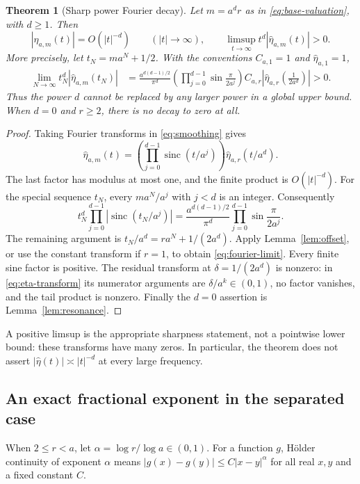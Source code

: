 \documentclass[11pt,a4paper]{article}
\newtheorem{theorem}{Theorem}[section]
\theoremstyle{definition}
\theoremstyle{remark}
\newcommand{\sinc}{\operatorname{sinc}}
\begin{document}
\begin{theorem}[Sharp power Fourier decay]\label{thm:fourier}
Let $m=a^dr$ as in \eqref{eq:base-valuation}, with $d\ge1$. Then
\begin{equation}\label{eq:fourier-order}
 |\widehat\eta_{a,m}(t)|=O(|t|^{-d})\qquad(|t|\to\infty),
 \qquad
 \limsup_{t\to\infty}t^d|\widehat\eta_{a,m}(t)|>0.
\end{equation}
More precisely, let $t_N=ma^N+1/2$. With the conventions
$C_{a,1}=1$ and $\widehat\eta_{a,1}=1$,
\begin{align}\label{eq:fourier-limit}
 \lim_{N\to\infty}t_N^d|\widehat\eta_{a,m}(t_N)|
 &=\frac{a^{d(d-1)/2}}{\pi^d}
   \left(\prod_{j=0}^{d-1}\sin\frac{\pi}{2a^j}\right)
   C_{a,r}\left|\widehat\eta_{a,r}\left(\frac1{2a^d}\right)\right|
 >0.
\end{align}
Thus the power $d$ cannot be replaced by any larger power in a global
upper bound. When $d=0$ and $r\ge2$, there is no decay to zero at all.
\end{theorem}
\begin{proof}
Taking Fourier transforms in \eqref{eq:smoothing} gives
\[
 \widehat\eta_{a,m}(t)
 =\left(\prod_{j=0}^{d-1}\sinc(t/a^j)\right)
   \widehat\eta_{a,r}(t/a^d).
\]
The last factor has modulus at most one, and the finite product is
$O(|t|^{-d})$.
For the special sequence $t_N$, every $ma^N/a^j$ with $j<d$ is an integer.
Consequently
\[
 t_N^d\prod_{j=0}^{d-1}|\sinc(t_N/a^j)|
 =\frac{a^{d(d-1)/2}}{\pi^d}
   \prod_{j=0}^{d-1}\sin\frac{\pi}{2a^j}.
\]
The remaining argument is
$t_N/a^d=ra^N+1/(2a^d)$. Apply Lemma~\ref{lem:offset}, or use the constant
transform if $r=1$, to obtain \eqref{eq:fourier-limit}.
Every finite sine factor is positive. The residual transform at
$\delta=1/(2a^d)$ is nonzero: in \eqref{eq:eta-transform} its numerator
arguments are $\delta/a^k\in(0,1)$, no factor vanishes, and the tail product
is nonzero. Finally the $d=0$ assertion is Lemma~\ref{lem:resonance}.
\end{proof}

A positive limsup is the appropriate sharpness statement, not a pointwise
lower bound: these transforms have many zeros. In particular, the theorem
does not assert $|\widehat\eta(t)|\asymp|t|^{-d}$ at every large frequency.

\subsection{An exact fractional exponent in the separated case}
\label{sec:holder}
When $2\le r<a$, let $\alpha=\log r/\log a\in(0,1)$. For a function $g$,
H\"older continuity of exponent $\alpha$ means
$|g(x)-g(y)|\le C|x-y|^\alpha$ for all real $x,y$ and a fixed constant $C$.
\end{document}
